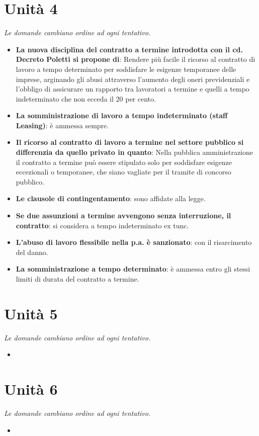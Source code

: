 \documentclass[12pt, a4paper]{report}
\begin{document}
\chapter{Unità 4}
    \textit{Le domande cambiano ordine ad ogni tentativo.}
    \begin{itemize}
        \item \textbf{La nuova disciplina del contratto a termine introdotta con il cd. Decreto Poletti si propone di}: Rendere più facile il ricorso al contratto di lavoro a tempo determinato per soddisfare le esigenze temporanee delle imprese, arginando gli abusi attraverso l’aumento degli oneri previdenziali e l’obbligo di assicurare un rapporto tra lavoratori a termine e quelli a tempo indeterminato che non ecceda il 20 per cento.
        \item \textbf{La somministrazione di lavoro a tempo indeterminato (staff Leasing)}: è ammessa sempre.
        \item \textbf{Il ricorso al contratto di lavoro a termine nel settore pubblico si differenzia da quello privato in quanto}: Nella pubblica amministrazione il contratto a termine può essere stipulato solo per soddisfare esigenze eccezionali o temporanee, che siano vagliate per il tramite di concorso pubblico.
        \item \textbf{Le clausole di contingentamento}: sono affidate alla legge.
        \item \textbf{Se due assunzioni a termine avvengono senza interruzione, il contratto}: si considera a tempo indeterminato ex tunc.
        \item \textbf{L’abuso di lavoro flessibile nella p.a. è sanzionato}: con il risarcimento del danno.
        \item \textbf{La somministrazione a tempo determinato}: è ammessa entro gli stessi limiti di durata del contratto a termine.
    \end{itemize}
\chapter{Unità 5}
    \textit{Le domande cambiano ordine ad ogni tentativo.}
    \begin{itemize}
        \item 
    \end{itemize}
\chapter{Unità 6}
    \textit{Le domande cambiano ordine ad ogni tentativo.}
    \begin{itemize}
        \item 
    \end{itemize}
\end{document}
